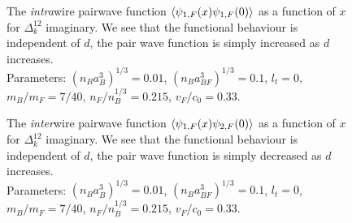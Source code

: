 \begin{figure} 
\begin{center}  
  
\caption{The \textit{intra}wire pairwave function $\braket{\psi_{1,F}(x)\psi_{1,F}(0)}$ as a function of $x$ for $\Delta^{12}_k$ imaginary. We see that the functional behaviour is independent of $d$, the pair wave function is simply increased as $d$ increases. \\
Parameters: $(n_Ba_B^3)^{1/3} = 0.01$, $(n_Ba_{BF}^3)^{1/3} = 0.1$, $l_t = 0$, $m_B / m_F = 7/40$, $n_F / n_B^{1/3} = 0.215$, $v_F / c_0 = 0.33$. }  
\label{fig.2wirespairwavefunction11}  
\vspace{0.5cm}
  
\caption{The \textit{inter}wire pairwave function $\braket{\psi_{1,F}(x)\psi_{2,F}(0)}$ as a function of $x$ for $\Delta^{12}_k$ imaginary. We see that the functional behaviour is independent of $d$, the pair wave function is simply decreased as $d$ increases. \\
Parameters: $(n_Ba_B^3)^{1/3} = 0.01$, $(n_Ba_{BF}^3)^{1/3} = 0.1$, $l_t = 0$, $m_B / m_F = 7/40$, $n_F / n_B^{1/3} = 0.215$, $v_F / c_0 = 0.33$. }  
\label{fig.2wirespairwavefunction12}  
\end{center}    
\end{figure}

